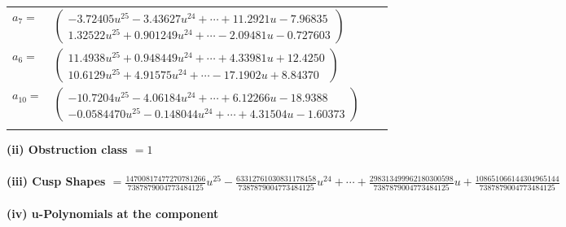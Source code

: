 \documentclass[1p]{elsarticle_modified}
\theoremstyle{definition}
\begin{document}
\begin{tabular}{m{7pt} m{180pt} m{7pt} m{180pt} }
\flushright $a_{7}=$&$\begin{pmatrix}-3.72405 u^{25}-3.43627 u^{24}+\cdots+11.2921 u-7.96835\\1.32522 u^{25}+0.901249 u^{24}+\cdots-2.09481 u-0.727603\end{pmatrix}$ \\
\flushright $a_{6}=$&$\begin{pmatrix}11.4938 u^{25}+0.948449 u^{24}+\cdots+4.33981 u+12.4250\\10.6129 u^{25}+4.91575 u^{24}+\cdots-17.1902 u+8.84370\end{pmatrix}$ \\
\flushright $a_{10}=$&$\begin{pmatrix}-10.7204 u^{25}-4.06184 u^{24}+\cdots+6.12266 u-18.9388\\-0.0584470 u^{25}-0.148044 u^{24}+\cdots+4.31504 u-1.60373\end{pmatrix}$\\&\end{tabular}
\flushleft \textbf{(ii) Obstruction class $= 1$}\\~\\
\flushleft \textbf{(iii) Cusp Shapes $= \frac{14700817477270781266}{7387879004773484125} u^{25}-\frac{63312761030831178458}{7387879004773484125} u^{24}+\cdots+\frac{298313499962180300598}{7387879004773484125} u+\frac{108651066144304965144}{7387879004773484125}$}\\~\\
\newpage\renewcommand{\arraystretch}{1}
\flushleft \textbf{(iv) u-Polynomials at the component}\newline \\
\end{document}
